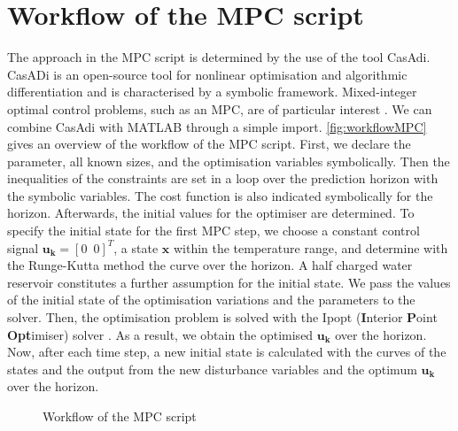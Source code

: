 \section{Workflow of the MPC script}
\label{section:workflowMPC}
The approach in the MPC script is determined by the use of the tool CasAdi. CasADi is an open-source tool for nonlinear optimisation and algorithmic differentiation and is characterised by a symbolic framework. Mixed-integer optimal control problems, such as an MPC, are of particular interest \cite{JoelA.E.Andersson.2018}. We can combine CasAdi with MATLAB through a simple import.\newline
\autoref{fig:workflowMPC} gives an overview of the workflow of the MPC script. First, we declare the parameter, all known sizes, and the optimisation variables symbolically. Then the inequalities of the constraints are set in a loop over the prediction horizon with the symbolic variables. The cost function is also indicated symbolically for the horizon. Afterwards, the initial values for the optimiser are determined. To specify the initial state for the first MPC step, we choose a constant control signal $\mathbf{u_k} = [0\enspace0]^T$, a state $\mathbf{x}$ within the temperature range, and determine with the Runge-Kutta method the curve over the horizon. A half charged water reservoir constitutes a further assumption for the initial state. We pass the values of the initial state of the optimisation variations and the parameters to the solver. Then, the optimisation problem is solved with the Ipopt (\textbf{I}nterior \textbf{P}oint \textbf{Opt}imiser) solver \cite{JoelA.E.Andersson.2018}. As a result, we obtain the optimised $\mathbf{u_k}$ over the horizon. Now, after each time step, a new initial state is calculated with the curves of the states and the output from the new disturbance variables and the optimum $\mathbf{u_k}$ over the horizon.
    \begin{figure}[h]
            \centering
            \def\svgwidth{0.75\textwidth}
            
            \caption{Workflow of the MPC script}
            \label{fig:workflowMPC}
    \end{figure}
    
